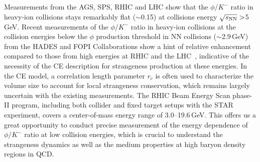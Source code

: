 \documentclass[%
 reprint,	
showpacs,
 amsmath,amssymb,
 aps,
 prc,
]{revtex4-1}
\begin{document}
Measurements from the AGS, SPS, RHIC and LHC show that the $\phi/K^-$ ratio in heavy-ion collisions stays remarkably flat ($\sim$0.15) at collisions energy $\sqrt{s_{\rm NN}}>$5\,GeV. Recent measurements of the $\phi/K^-$ ratio in heavy-ion collisions at the collision energies below the $\phi$ production threshold in NN collisions ($\sim$2.9\,GeV) from the HADES and FOPI Collaborations show a hint of relative enhancement compared to those from high energies at RHIC and the LHC~\cite{E917_phi,NA49_phi,FOPI_phi_AlAl,FOPI_phi_NiNi,HADES_phi_ArKCl,HADES_phi_AuAu}, %
indicative of the necessity of the CE description for strangeness production at these energies. In the CE model, a correlation length parameter $r_c$ is often used to characterize the volume size to account for local strangeness conservation, which remains largely uncertain with the existing measurements.
The RHIC Beam Energy Scan phase-II program, including both collider and fixed target setups with the STAR experiment, covers a center-of-mass energy range of 3.0--19.6\,GeV. This offers us a great opportunity to conduct precise measurement of the energy dependence of $\phi/K^-$ ratio at low collision energies, which is crucial to understand the strangeness dynamics as well as the medium properties at high baryon density regions in QCD.
\end{document}

